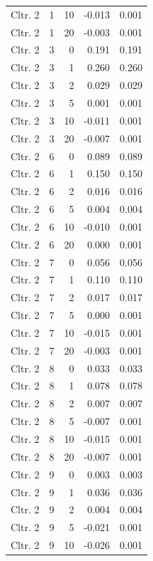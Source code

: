 \begin{longtable}{lrrrr}
  Cltr. 2 &    1 &   10 & -0.013 & 0.001 \\ 
  Cltr. 2 &    1 &   20 & -0.003 & 0.001 \\ 
  Cltr. 2 &    3 &    0 & 0.191 & 0.191 \\ 
  Cltr. 2 &    3 &    1 & 0.260 & 0.260 \\ 
  Cltr. 2 &    3 &    2 & 0.029 & 0.029 \\ 
  Cltr. 2 &    3 &    5 & 0.001 & 0.001 \\ 
  Cltr. 2 &    3 &   10 & -0.011 & 0.001 \\ 
  Cltr. 2 &    3 &   20 & -0.007 & 0.001 \\ 
  Cltr. 2 &    6 &    0 & 0.089 & 0.089 \\ 
  Cltr. 2 &    6 &    1 & 0.150 & 0.150 \\ 
  Cltr. 2 &    6 &    2 & 0.016 & 0.016 \\ 
  Cltr. 2 &    6 &    5 & 0.004 & 0.004 \\ 
  Cltr. 2 &    6 &   10 & -0.010 & 0.001 \\ 
  Cltr. 2 &    6 &   20 & 0.000 & 0.001 \\ 
  Cltr. 2 &    7 &    0 & 0.056 & 0.056 \\ 
  Cltr. 2 &    7 &    1 & 0.110 & 0.110 \\ 
  Cltr. 2 &    7 &    2 & 0.017 & 0.017 \\ 
  Cltr. 2 &    7 &    5 & 0.000 & 0.001 \\ 
  Cltr. 2 &    7 &   10 & -0.015 & 0.001 \\ 
  Cltr. 2 &    7 &   20 & -0.003 & 0.001 \\ 
  Cltr. 2 &    8 &    0 & 0.033 & 0.033 \\ 
  Cltr. 2 &    8 &    1 & 0.078 & 0.078 \\ 
  Cltr. 2 &    8 &    2 & 0.007 & 0.007 \\ 
  Cltr. 2 &    8 &    5 & -0.007 & 0.001 \\ 
  Cltr. 2 &    8 &   10 & -0.015 & 0.001 \\ 
  Cltr. 2 &    8 &   20 & -0.007 & 0.001 \\ 
  Cltr. 2 &    9 &    0 & 0.003 & 0.003 \\ 
  Cltr. 2 &    9 &    1 & 0.036 & 0.036 \\ 
  Cltr. 2 &    9 &    2 & 0.004 & 0.004 \\ 
  Cltr. 2 &    9 &    5 & -0.021 & 0.001 \\ 
  Cltr. 2 &    9 &   10 & -0.026 & 0.001 \\ 

\end{longtable}
